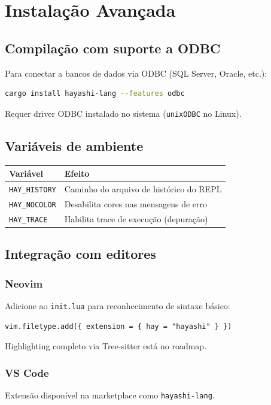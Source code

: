 \chapter{Instalação Avançada}
\label{apendice:instalacao}

\section{Compilação com suporte a ODBC}

Para conectar \hayashi{} a bancos de dados via ODBC (SQL Server, Oracle, etc.):

\begin{lstlisting}[style=inline, language=sh]
cargo install hayashi-lang --features odbc
\end{lstlisting}

Requer driver ODBC instalado no sistema (\texttt{unixODBC} no Linux).

\section{Variáveis de ambiente}

\begin{center}
\begin{tabular}{ll}
\toprule
\textbf{Variável} & \textbf{Efeito} \\
\midrule
\texttt{HAY\_HISTORY}  & Caminho do arquivo de histórico do REPL \\
\texttt{HAY\_NOCOLOR}  & Desabilita cores nas mensagens de erro \\
\texttt{HAY\_TRACE}    & Habilita trace de execução (depuração) \\
\bottomrule
\end{tabular}
\end{center}

\section{Integração com editores}

\subsection*{Neovim}

Adicione ao \texttt{init.lua} para reconhecimento de sintaxe básico:

\begin{lstlisting}[style=inline, language=Hayashi]
vim.filetype.add({ extension = { hay = "hayashi" } })
\end{lstlisting}

Highlighting completo via Tree-sitter está no roadmap.

\subsection*{VS Code}

Extensão disponível na marketplace como \texttt{hayashi-lang}.
